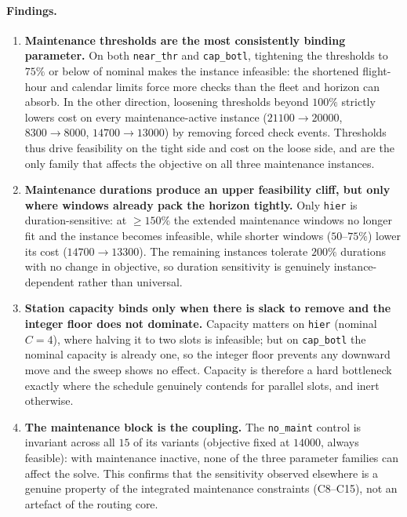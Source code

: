 \paragraph{Findings.}
\begin{enumerate}
  \item \textbf{Maintenance thresholds are the most consistently binding
    parameter.}  On both \texttt{near\_thr} and \texttt{cap\_botl}, tightening
    the thresholds to $75\%$ or below of nominal makes the instance infeasible:
    the shortened flight-hour and calendar limits force more checks than the
    fleet and horizon can absorb.  In the other direction, loosening thresholds
    beyond $100\%$ strictly lowers cost on every maintenance-active instance
    ($21100\!\to\!20000$, $8300\!\to\!8000$, $14700\!\to\!13000$) by removing
    forced check events.  Thresholds thus drive feasibility on the tight side
    and cost on the loose side, and are the only family that affects the
    objective on all three maintenance instances.
  \item \textbf{Maintenance durations produce an upper feasibility cliff, but
    only where windows already pack the horizon tightly.}  Only
    \texttt{hier} is duration-sensitive: at $\geq\!150\%$ the extended
    maintenance windows no longer fit and the instance becomes infeasible,
    while shorter windows ($50$--$75\%$) lower its cost
    ($14700\!\to\!13300$).  The remaining instances tolerate $200\%$ durations
    with no change in objective, so duration sensitivity is genuinely
    instance-dependent rather than universal.
  \item \textbf{Station capacity binds only when there is slack to remove and
    the integer floor does not dominate.}  Capacity matters on \texttt{hier}
    (nominal $C\!=\!4$), where halving it to two slots is infeasible; but on
    \texttt{cap\_botl} the nominal capacity is already one, so the integer
    floor prevents any downward move and the sweep shows no effect.  Capacity
    is therefore a hard bottleneck exactly where the schedule genuinely
    contends for parallel slots, and inert otherwise.
  \item \textbf{The maintenance block is the coupling.}  The
    \texttt{no\_maint} control is invariant across all $15$ of its variants
    (objective fixed at $14000$, always feasible): with maintenance inactive,
    none of the three parameter families can affect the solve.  This confirms
    that the sensitivity observed elsewhere is a genuine property of the
    integrated maintenance constraints (C8--C15), not an artefact of the
    routing core.
\end{enumerate}

